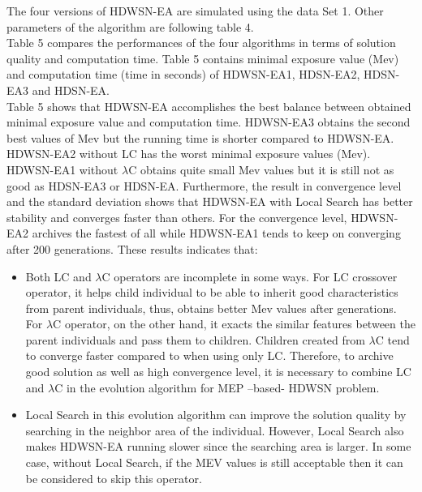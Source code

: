\documentclass[final]{elsarticle}
\begin{document}
The four versions of HDWSN-EA are simulated using the data Set 1. Other parameters of the algorithm are following table 4.\\
Table 5 compares the performances of the four algorithms in terms of solution quality and computation time. Table 5 contains minimal exposure value (Mev) and computation time (time in seconds) of HDWSN-EA1, HDSN-EA2, HDSN-EA3 and HDSN-EA.\\
Table 5 shows that HDWSN-EA accomplishes the best balance between obtained minimal exposure value and computation time. HDWSN-EA3 obtains the second best values of Mev but the running time is shorter compared to HDWSN-EA. HDWSN-EA2 without LC has the worst minimal exposure values (Mev). HDWSN-EA1 without $\lambda$C obtains quite small Mev values but it is still not as good as HDSN-EA3 or HDSN-EA. Furthermore, the result in convergence level and the standard deviation shows that HDWSN-EA with Local Search has better stability and converges faster than others. For the convergence level, HDWSN-EA2 archives the fastest of all while HDWSN-EA1 tends to keep on converging after 200 generations. These results indicates that:
\begin{itemize}
	\item Both LC and $\lambda$C operators are incomplete in some ways. For LC crossover operator, it helps child individual to be able to inherit good characteristics from parent individuals, thus, obtains better Mev values after generations. For $\lambda$C operator, on the other hand, it exacts the similar features between the parent individuals and pass them to children. Children created from $\lambda$C tend to converge faster compared to when using only LC. Therefore, to archive good solution as well as high convergence level, it is necessary to combine LC and $\lambda$C in the evolution algorithm for MEP –based- HDWSN problem.
	\item Local Search in this evolution algorithm can improve the solution quality by searching in the neighbor area of the individual. However, Local Search also makes HDWSN-EA running slower since the searching area is larger. In some case, without Local Search, if the MEV values is still acceptable then it can be considered to skip this operator.	
\end{itemize}
\end{document}
